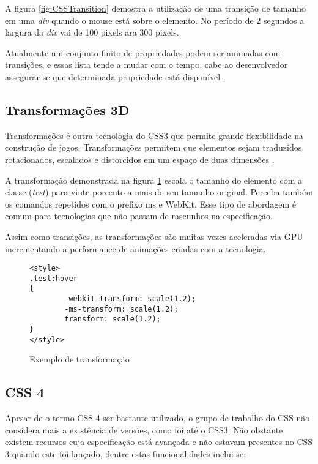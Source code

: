 A figura \ref{fig:CSSTransition} demostra a utilização de uma
transição de tamanho em uma \textit{div} quando o mouse está sobre o
elemento. No período de 2 segundos a largura da \textit{div} vai de 100
pixels ara 300 pixels.

Atualmente um conjunto finito de propriedades podem ser animadas
com transições, e essas lista tende a mudar com o tempo, cabe ao
desenvolvedor assegurar-se que determinada propriedade está disponível
\autocite{mdnTransitions}.

\subsection{Transformações 3D}

Transformações é outra tecnologia do CSS3 que permite grande
flexibilidade na construção de jogos. Transformações permitem que
elementos sejam traduzidos, rotacionados, escalados e distorcidos em um
espaço de duas dimensões \autocite{html5mostwanted}.

A transformação demonstrada na figura \ref{fig:CSSTransform} escala o
tamanho do elemento com a classe (\textit{test}) para vinte porcento a
mais do seu tamanho original. Perceba também os comandos repetidos com
o prefixo ms e WebKit. Esse tipo de abordagem é comum para tecnologias
que não passam de rascunhos na especificação.

Assim como transições, as transformações são muitas vezes aceleradas
via GPU incrementando a performance de animações criadas com a tecnologia.

\begin{figure}
\centering
\begin{verbatim}
<style>
.test:hover
{
        -webkit-transform: scale(1.2);
        -ms-transform: scale(1.2);
        transform: scale(1.2);
}
</style>
\end{verbatim}
\caption{Exemplo de transformação}
\label{fig:CSSTransform}
\end{figure}

\subsection{CSS 4}

Apesar de o termo CSS 4 ser bastante utilizado, o grupo de trabalho do CSS
não considera mais a existência de versões, como foi até o CSS3.
Não obstante existem recursos cuja especificação está avançada e não estavam presentes
no CSS 3 quando este foi lançado, dentre estas funcionalidades inclui-se:

